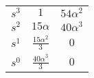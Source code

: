\documentclass{standalone}
\begin{document}
\begin{tabular}{c | c | c}
  $s^3$ & $1$                    & $54\alpha^2$ \\
  $s^2$ & $15\alpha$             & $40\alpha^3$ \\
  $s^1$ & $\frac{15\alpha^2}{3}$ & $0$     \\
  $s^0$ & $\frac{40\alpha^3}{3}$ & $0$
\end{tabular}
\end{document}
